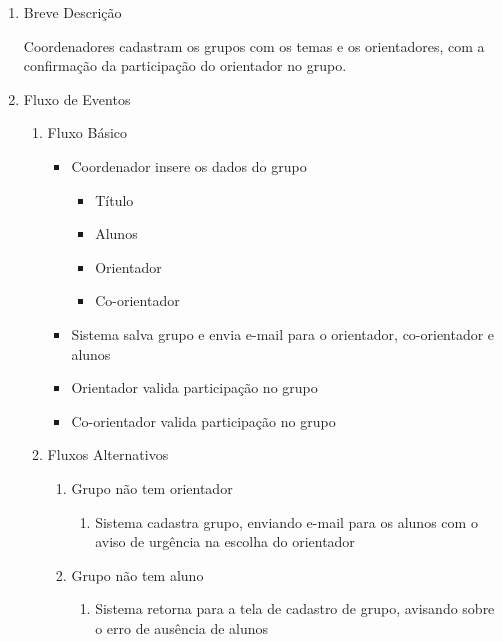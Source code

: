 \begin{enumerate}
    \item Breve Descrição


Coordenadores cadastram os grupos com os temas e os orientadores, com a confirmação da participação do orientador no grupo.


    \item Fluxo de Eventos

\begin{enumerate}
    \item Fluxo Básico

\begin{itemize}
    \item Coordenador insere os dados do grupo

\begin{itemize}
    \item Título

    \item Alunos

    \item Orientador

    \item Co-orientador


\end{itemize}
    \item Sistema salva grupo e envia e-mail para o orientador, co-orientador e alunos

    \item Orientador valida participação no grupo

    \item Co-orientador valida participação no grupo
\end{itemize}


    \item Fluxos Alternativos

\begin{enumerate}
    \item Grupo não tem orientador

\begin{enumerate}
    \item Sistema cadastra grupo, enviando e-mail para os alunos com o aviso de urgência na escolha do orientador


\end{enumerate}
    \item Grupo não tem aluno

\begin{enumerate}
    \item Sistema retorna para a tela de cadastro de grupo, avisando sobre o erro de ausência de alunos
\end{enumerate}
\end{enumerate}



\end{enumerate}
\end{enumerate}
